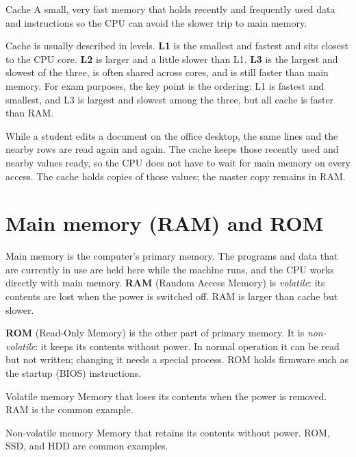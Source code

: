 \begin{definitionbox}{Cache}
A small, very fast memory that holds recently and frequently used data and
instructions so the CPU can avoid the slower trip to main memory.
\end{definitionbox}

Cache is usually described in levels. \textbf{L1} is the smallest and
fastest and sits closest to the CPU core. \textbf{L2} is larger and a little
slower than L1. \textbf{L3} is the largest and slowest of the three, is
often shared across cores, and is still faster than main memory. For exam
purposes, the key point is the ordering: L1 is fastest and smallest, and L3
is largest and slowest among the three, but all cache is faster than RAM.

\begin{example}
While a student edits a document on the office desktop, the same lines and
the nearby rows are read again and again. The cache keeps those recently
used and nearby values ready, so the CPU does not have to wait for main
memory on every access. The cache holds copies of those values; the master
copy remains in RAM.
\end{example}

\section{Main memory (RAM) and ROM}
Main memory is the computer's primary memory. The programs and data that
are currently in use are held here while the machine runs, and the CPU works
directly with main memory. \textbf{RAM} (Random Access Memory) is
\emph{volatile}: its contents are lost when the power is switched off. RAM
is larger than cache but slower.

\textbf{ROM} (Read-Only Memory) is the other part of primary memory. It is
\emph{non-volatile}: it keeps its contents without power. In normal
operation it can be read but not written; changing it needs a special
process. ROM holds firmware such as the startup (BIOS) instructions.

\begin{definitionbox}{Volatile memory}
Memory that loses its contents when the power is removed. RAM is the common
example.
\end{definitionbox}

\begin{definitionbox}{Non-volatile memory}
Memory that retains its contents without power. ROM, SSD, and HDD are common
examples.
\end{definitionbox}

